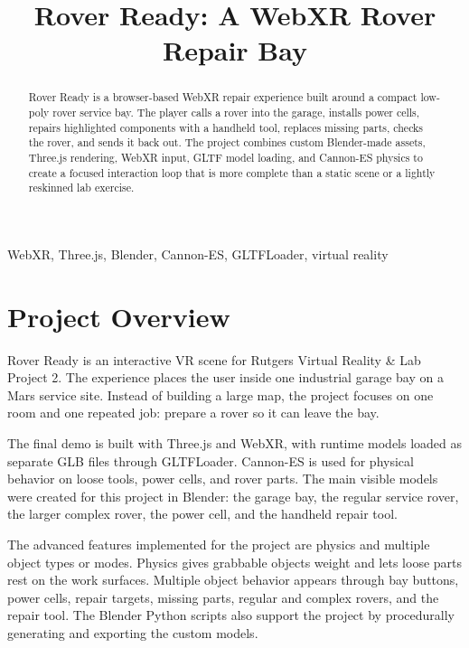 \documentclass[conference]{IEEEtran}
\begin{document}
\title{Rover Ready: A WebXR Rover Repair Bay}

\author{
}

\maketitle

\begin{abstract}
	Rover Ready is a browser-based WebXR repair experience built around a compact
	low-poly rover service bay. The player calls a rover into the garage, installs
	power cells, repairs highlighted components with a handheld tool, replaces
	missing parts, checks the rover, and sends it back out. The project combines
	custom Blender-made assets, Three.js rendering, WebXR input, GLTF model loading,
	and Cannon-ES physics to create a focused interaction loop that is more complete
	than a static scene or a lightly reskinned lab exercise.
\end{abstract}

\begin{IEEEkeywords}
	WebXR, Three.js, Blender, Cannon-ES, GLTFLoader, virtual reality
\end{IEEEkeywords}

\section{Project Overview}

Rover Ready is an interactive VR scene for Rutgers Virtual Reality \& Lab
Project 2. The experience places the user inside one industrial garage bay on a
Mars service site. Instead of building a large map, the project focuses on one
room and one repeated job: prepare a rover so it can leave the bay.

The final demo is built with Three.js and WebXR, with runtime models loaded as
separate GLB files through GLTFLoader. Cannon-ES is used for physical behavior
on loose tools, power cells, and rover parts. The main visible models were
created for this project in Blender: the garage bay, the regular service rover,
the larger complex rover, the power cell, and the handheld repair tool.

The advanced features implemented for the project are physics and multiple
object types or modes. Physics gives grabbable objects weight and lets loose
parts rest on the work surfaces. Multiple object behavior appears through bay
buttons, power cells, repair targets, missing parts, regular and complex rovers,
and the repair tool. The Blender Python scripts also support the project by
procedurally generating and exporting the custom models.
\end{document}
